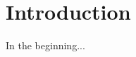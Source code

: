 \documentclass[11pt, a4paper, oneside]{book}
\begin{document}

\frontmatter

\tableofcontents
\mainmatter

\chapter{Introduction}

In the beginning...


\end{document}
